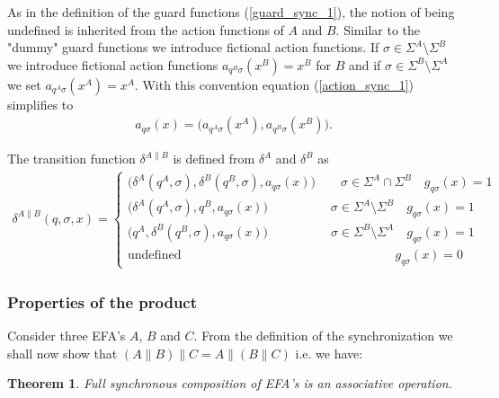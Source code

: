 \documentclass{article}
\newtheorem{theorem}{Theorem}
\begin{document}
As in the definition of the guard functions (\ref{guard_sync_1}),
the notion of being undefined is inherited from the action
functions of $A$ and $B$. Similar to the "dummy" guard functions
we introduce fictional action functions. If $\sigma\in \Sigma^A
\setminus \Sigma^B$ we introduce fictional action functions
$a_{q^B\sigma}(x^B)=x^B$ for $B$ and if
$\sigma\in\Sigma^B\setminus \Sigma^A$ we set
$a_{q^A\sigma}(x^A)=x^A$. With this convention equation
(\ref{action_sync_1}) simplifies to
\begin{eqnarray}
a_{q \sigma}(x)=
 \big(a_{q^A \sigma}(x^{A}), a_{q^B \sigma}(x^{B})\big).
\end{eqnarray}


 The transition function $\delta^{A\|B}$ is defined from $\delta^A$ and $\delta^B$ as
\begin{eqnarray}
\delta^{A\|B}(q,\sigma,x)=\left\{
\begin{array}{ll}
\big(\delta^A(q^A,\sigma),\delta^B(q^B,\sigma),a_{q \sigma}(x)\big) \quad\quad \sigma\in \Sigma^A \cap \Sigma^B \quad g_{q \sigma}(x)=1\\
\big(\delta^A(q^A,\sigma),q^B,a_{q \sigma}(x)\big) \quad\quad\quad\quad\quad \sigma\in \Sigma^A \setminus \Sigma^B \quad g_{q \sigma}(x)=1\\
\big(q^A,\delta^B(q^B,\sigma),a_{q \sigma}(x)\big) \quad\quad\quad\quad\quad \sigma\in \Sigma^B \setminus \Sigma^A \quad g_{q \sigma}(x)=1\\
\textrm{
undefined}\quad\quad\quad\quad\quad\quad\quad\quad\quad\quad\quad\quad\quad\quad\quad\quad\quad
g_{q\sigma}(x)=0
\end{array}\right.
\end{eqnarray}

\subsubsection{Properties of the product}

Consider three EFA's $A$, $B$ and $C$. From the definition of the
synchronization we shall now show that
 $(A\|B)\|C=A\|(B\|C)$ i.e. we have:
\begin{theorem}
   Full synchronous composition of EFA's is an associative
   operation.
\end{theorem}
\end{document}
